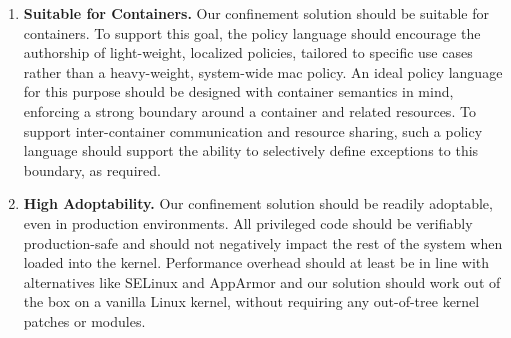 \begin{enumerate}[font=\bfseries]
  \item \label{i:dg-suitability} \textbf{Suitable for Containers.}
    Our confinement solution should be suitable for containers. To support this goal, the
    policy language should encourage the authorship of light-weight, localized policies,
    tailored to specific use cases rather than a heavy-weight, system-wide \gls{mac}
    policy.  An ideal policy language for this purpose should be designed with container
    semantics in mind, enforcing a strong boundary around a container and related
    resources. To support inter-container communication and resource sharing, such
    a policy language should support the ability to selectively define exceptions to this
    boundary, as required.

  \item \label{i:dg-adoptability} \textbf{High Adoptability.}
    Our confinement solution should be readily adoptable, even in production environments.
    All privileged code should be verifiably production-safe and should not negatively
    impact the rest of the system when loaded into the kernel. Performance overhead should
    at least be in line with alternatives like SELinux and AppArmor and our solution
    should work out of the box on a vanilla Linux kernel, without requiring any
    out-of-tree kernel patches or modules.

\end{enumerate}


